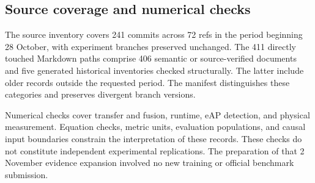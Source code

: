 \subsection{Source coverage and numerical checks}
The source inventory covers 241 commits across 72 refs in the period beginning
28 October, with experiment branches preserved unchanged.
The 411 directly touched Markdown paths comprise 406 semantic or source-verified
documents and five generated historical inventories checked structurally.
The latter include older records outside the requested period. The manifest
distinguishes these categories and preserves divergent branch versions.

Numerical checks cover transfer and fusion, runtime, eAP detection, and physical
measurement. Equation checks, metric units, evaluation populations, and causal
input boundaries constrain the interpretation of these records. These checks
do not constitute independent experimental replications. The preparation of
that 2 November evidence expansion involved no new training or official benchmark submission.

